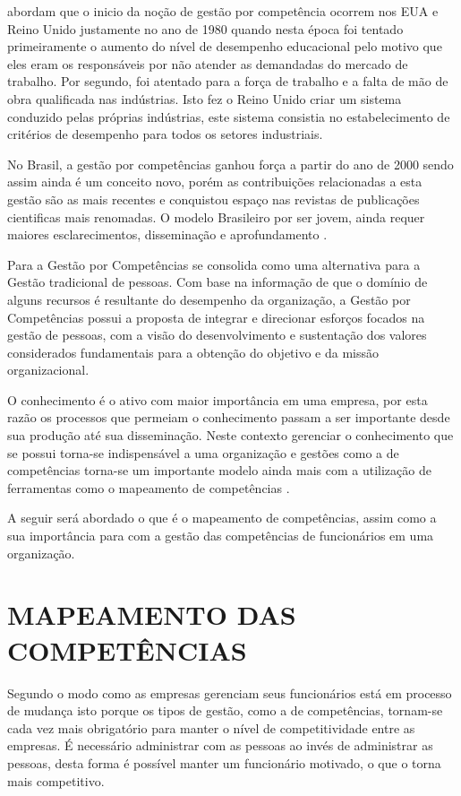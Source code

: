  abordam que o inicio da noção de gestão por competência ocorrem nos EUA e Reino Unido justamente no ano de 1980 quando nesta época foi tentado primeiramente o aumento do nível de desempenho educacional pelo motivo que eles eram os responsáveis por não atender as demandadas do mercado de trabalho. Por segundo, foi atentado para a força de trabalho e a falta de mão de obra qualificada nas indústrias. Isto fez o Reino Unido criar um sistema conduzido pelas próprias indústrias, este sistema consistia no estabelecimento de critérios de desempenho para todos os setores industriais.

No Brasil, a gestão por competências ganhou força a partir do ano de 2000 sendo assim ainda é um conceito novo, porém as contribuições relacionadas a esta gestão são as mais recentes e conquistou espaço nas revistas de publicações cientificas mais renomadas. O modelo Brasileiro por ser jovem, ainda requer maiores esclarecimentos, disseminação e aprofundamento \cite{zago2013cultura}.

Para  a Gestão por Competências se consolida como uma alternativa para a Gestão tradicional de pessoas. Com base na informação de que o domínio de alguns recursos é resultante do desempenho da organização, a Gestão por Competências possui a proposta de integrar e direcionar esforços focados na gestão de pessoas, com a visão do desenvolvimento e sustentação dos valores considerados fundamentais para a obtenção do objetivo e da missão organizacional.

O conhecimento é o ativo com maior importância em uma empresa, por esta razão os processos que permeiam o conhecimento passam a ser importante desde sua produção até sua disseminação. Neste contexto gerenciar o conhecimento que se possui torna-se indispensável a uma organização e gestões como a de competências torna-se um importante modelo ainda mais com a utilização de ferramentas como o mapeamento de competências \cite{torres2012mapeamento}.

A seguir será abordado o que é o mapeamento de competências, assim como a sua importância para com a gestão das competências de funcionários em uma organização.

\section{MAPEAMENTO DAS COMPETÊNCIAS}

Segundo  o modo como as empresas gerenciam seus funcionários está em processo de mudança isto porque os tipos de gestão, como a de competências, tornam-se cada vez mais obrigatório para manter o nível de competitividade entre as empresas. É necessário administrar com as pessoas ao invés de administrar as pessoas, desta forma é possível manter um funcionário motivado, o que o torna mais competitivo.

